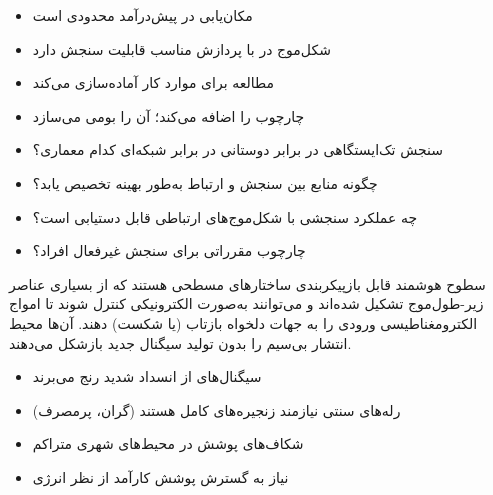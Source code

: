 
\begin{itemize}
\tightlist
\item
  مکان‌یابی  در  پیش‌درآمد محدودی است
\item
  شکل‌موج  در  با پردازش مناسب قابلیت سنجش دارد
\item
  مطالعه  برای موارد کار  آماده‌سازی می‌کند
\item
   چارچوب را اضافه می‌کند؛  آن را بومی می‌سازد
\end{itemize}


\begin{itemize}
\tightlist
\item
  سنجش تک‌ایستگاهی در برابر دوستانی در برابر شبکه‌ای  کدام معماری؟
\item
  چگونه منابع بین سنجش و ارتباط به‌طور بهینه تخصیص یابد؟
\item
  چه عملکرد سنجشی با شکل‌موج‌های ارتباطی قابل دستیابی است؟
\item
  چارچوب مقرراتی برای سنجش غیرفعال افراد؟
\end{itemize}



\CNchained{}

\CNchained{}

سطوح هوشمند قابل بازپیکربندی  ساختارهای مسطحی هستند که از بسیاری عناصر زیر-طول‌موج تشکیل شده‌اند و می‌توانند به‌صورت الکترونیکی کنترل شوند تا امواج الکترومغناطیسی ورودی را به جهات دلخواه بازتاب (یا شکست) دهند. آن‌ها محیط انتشار بی‌سیم را بدون تولید سیگنال جدید بازشکل می‌دهند.


\begin{itemize}
\tightlist
\item
  سیگنال‌های  از انسداد شدید رنج می‌برند
\item
  رله‌های سنتی نیازمند زنجیره‌های  کامل هستند (گران، پرمصرف)
\item
  شکاف‌های پوشش  در محیط‌های شهری متراکم
\item
  نیاز به گسترش پوشش کارآمد از نظر انرژی
\end{itemize}

